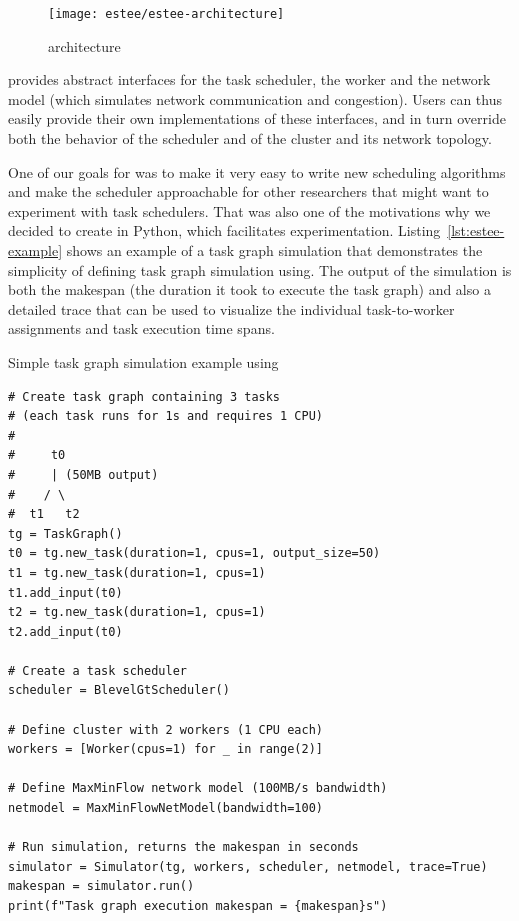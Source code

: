 \begin{figure}
	\centering
	\texttt{[image: estee/estee-architecture]}
	\caption{\estee{} architecture}
	\label{fig:estee-architecture}
\end{figure}

\estee{} provides abstract interfaces for the task scheduler, the worker and the
network model (which simulates network communication and congestion). Users can thus easily provide
their own implementations of these interfaces, and in turn override both the behavior of the
scheduler and of the cluster and its network topology.

One of our goals for \estee{} was to make it very easy to write new scheduling
algorithms and make the scheduler approachable for other researchers that might want to experiment
with task schedulers. That was also one of the motivations why we decided to create
\estee{} in Python, which facilitates experimentation. Listing~\ref{lst:estee-example}
shows an example of a task graph simulation that demonstrates the simplicity of defining task graph
simulation using\estee{}. The output of the simulation is both the makespan (the
duration it took to execute the task graph) and also a detailed trace that can be used to visualize
the individual task-to-worker assignments and task execution time spans.

\begin{listing}
	\caption{Simple task graph simulation example using \estee{}}
	\label{lst:estee-example}
	\begin{verbatim}
# Create task graph containing 3 tasks
# (each task runs for 1s and requires 1 CPU)
#
#     t0
#     | (50MB output)
#    / \
#  t1   t2
tg = TaskGraph()
t0 = tg.new_task(duration=1, cpus=1, output_size=50)
t1 = tg.new_task(duration=1, cpus=1)
t1.add_input(t0)
t2 = tg.new_task(duration=1, cpus=1)
t2.add_input(t0)

# Create a task scheduler
scheduler = BlevelGtScheduler()

# Define cluster with 2 workers (1 CPU each)
workers = [Worker(cpus=1) for _ in range(2)]

# Define MaxMinFlow network model (100MB/s bandwidth)
netmodel = MaxMinFlowNetModel(bandwidth=100)

# Run simulation, returns the makespan in seconds
simulator = Simulator(tg, workers, scheduler, netmodel, trace=True)
makespan = simulator.run()
print(f"Task graph execution makespan = {makespan}s")
\end{verbatim}
\end{listing}

